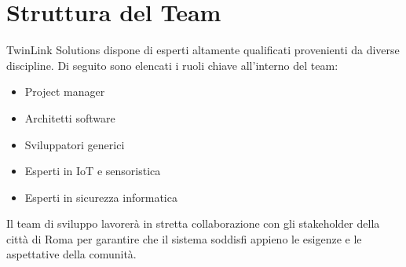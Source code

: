 \section{Struttura del Team}

TwinLink Solutions dispone di esperti altamente qualificati provenienti da diverse discipline. Di seguito sono elencati i ruoli chiave all'interno del team:

\begin{itemize}
    \item Project manager
    \item Architetti software
    \item Sviluppatori generici
    \item Esperti in IoT e sensoristica
    \item Esperti in sicurezza informatica
\end{itemize}

Il team di sviluppo lavorerà in stretta collaborazione con gli stakeholder della città di Roma per garantire che il sistema soddisfi appieno le esigenze e le aspettative della comunità.
